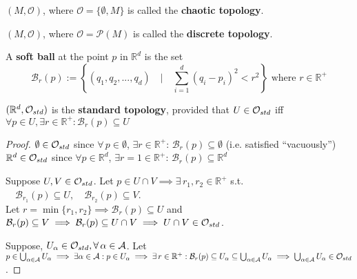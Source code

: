 \begin{definition}
  $(M , \mathcal{O})$, where $\mathcal{O} = \lbrace \emptyset, M\rbrace$ is called the \textbf{chaotic topology}.
\end{definition}

\begin{definition}
  $(M , \mathcal{O})$, where $\mathcal{O} = \mathcal{P}(M)$ is called the \textbf{discrete topology}.
\end{definition}

\begin{definition}
A \textbf{soft ball} at the point $p$ in $\mathbb{R}^d$ is the set
\begin{equation*}
\mathcal{B}_r(p) := \left\{ (q_1, q_2, ..., q_d) \quad | \quad \displaystyle\sum_{i=1}^{d} (q_i - p_i)^2 < r^2 \right\} \text{ where } r \in \mathbb{R}^+
\end{equation*}
\end{definition}

\begin{definition}
  $(\mathbb{R}^d, \mathcal{O}_{std})$ is the \textbf{standard topology}, provided that $U \in \mathcal{O}_{std}$ iff \\
  $\forall p \in U, \exists r \in \mathbb{R}^+: \mathcal{B}_r(p) \subseteq U$
\end{definition}

\begin{proof}
$\emptyset \in \mathcal{O}_{std}$ since $\forall \, p \in \emptyset$, $\exists r \in \mathbb{R}^+$: $\mathcal{B}_r(p) \subseteq \emptyset$ (i.e. satisfied ``vacuously'') \\
$\mathbb{R}^d \in \mathcal{O}_{std}$ since $\forall p \in \mathbb{R}^d$, $\exists r = 1 \in \mathbb{R}^+$: $\mathcal{B}_r(p) \subseteq \mathbb{R}^d$
 
Suppose $U, V \in \mathcal{O}_{std}$. Let $p \in U \cap V \implies \exists \, r_1, r_2 \in \mathbb{R}^+$ s.t. $\quad \mathcal{B}_{r_1}(p) \subseteq U, \quad \mathcal{B}_{r_2}(p) \subseteq V$. \\
Let $r=\min{ \lbrace r_1, r_2 \rbrace} \implies \mathcal{B}_r(p) \subseteq U$ and $\mathcal{B}_r(p) \subseteq V \implies \mathcal{B}_r(p) \subseteq U \cap V \implies U \cap V \in \mathcal{O}_{std}$.

Suppose, $U_{\alpha} \in \mathcal{O}_{std}, \forall \, \alpha \in \mathcal{A}$. Let $p \in \bigcup_{\alpha \in \mathcal{A}} U_{\alpha} \implies \exists \alpha \in \mathcal{A}: p \in U_{\alpha} \\
\implies \exists \, r \in \mathbb{R}^+ : \mathcal{B}_{r}(p) \subseteq U_{\alpha} \subseteq \bigcup_{\alpha \in \mathcal{A}} U_{\alpha} \implies \bigcup_{\alpha \in \mathcal{A}} U_{\alpha} \in \mathcal{O}_{std}$.
\end{proof}

